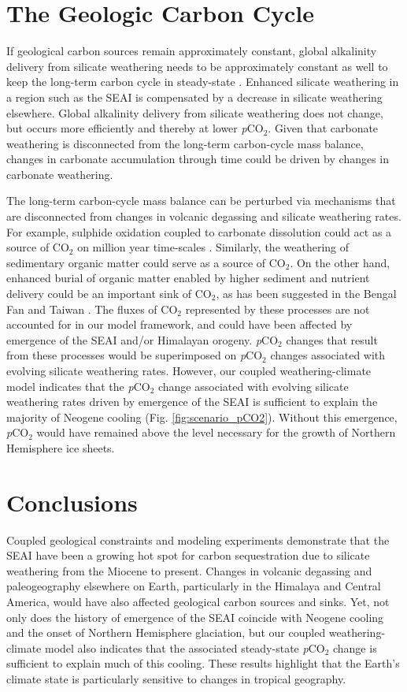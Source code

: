 \documentclass[9pt,twocolumn,twoside,lineno]{pnas-new}
\newcommand{\pCOtwo}{\textit{p}CO$_{2}$\xspace}
\newcommand{\COtwo}{CO$_{2}$\xspace}
\begin{document}
\section*{The Geologic Carbon Cycle}

If geological carbon sources remain approximately constant, global alkalinity delivery from silicate weathering needs to be approximately constant as well to keep the long-term carbon cycle in steady-state \cite{Kump1997a}. Enhanced silicate weathering in a region such as the SEAI is compensated by a decrease in silicate weathering elsewhere. Global alkalinity delivery from silicate weathering does not change, but occurs more efficiently and thereby at lower \pCOtwo. Given that carbonate weathering is disconnected from the long-term carbon-cycle mass balance, changes in carbonate accumulation through time \cite{Si2019a} could be driven by changes in carbonate weathering.

The long-term carbon-cycle mass balance can be perturbed via mechanisms that are disconnected from changes in volcanic degassing and silicate weathering rates. For example, sulphide oxidation coupled to carbonate dissolution could act as a source of \COtwo on million year time-scales \cite{Torres2014a}. Similarly, the weathering of sedimentary organic matter could serve as a source of \COtwo \cite{Hilton2014a}. On the other hand, enhanced burial of organic matter enabled by higher sediment and nutrient delivery could be an important sink of \COtwo, as has been suggested in the Bengal Fan \cite{Galy2007a} and Taiwan \cite{Kao2014a}. The fluxes of \COtwo represented by these processes are not accounted for in our model framework, and could have been affected by emergence of the SEAI and/or Himalayan orogeny. \pCOtwo changes that result from these processes would be superimposed on \pCOtwo changes associated with evolving silicate weathering rates. However, our coupled weathering-climate model indicates that the \pCOtwo change associated with evolving silicate weathering rates driven by emergence of the SEAI is sufficient to explain the majority of Neogene cooling (Fig. \ref{fig:scenario_pCO2}). Without this emergence, \pCOtwo would have remained above the level necessary for the growth of Northern Hemisphere ice sheets.

\section*{Conclusions}

Coupled geological constraints and modeling experiments demonstrate that the SEAI have been a growing hot spot for carbon sequestration due to silicate weathering from the Miocene to present. Changes in volcanic degassing and paleogeography elsewhere on Earth, particularly in the Himalaya and Central America, would have also affected geological carbon sources and sinks. Yet, not only does the history of emergence of the SEAI coincide with Neogene cooling and the onset of Northern Hemisphere glaciation, but our coupled weathering-climate model also indicates that the associated steady-state \pCOtwo change is sufficient to explain much of this cooling. These results highlight that the Earth's climate state is particularly sensitive to changes in tropical geography.
\end{document}

